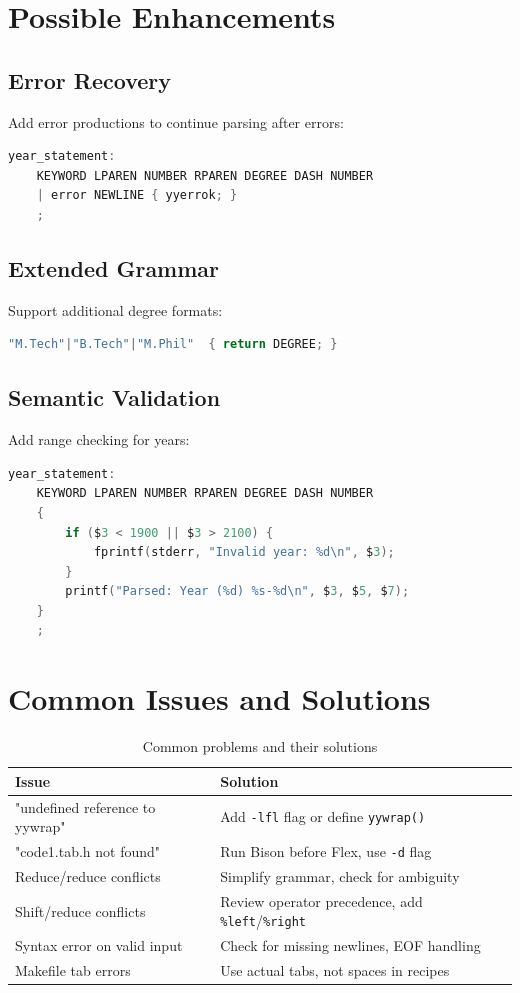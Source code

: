 \documentclass[12pt,a4paper]{article}
\begin{document}
\section{Possible Enhancements}

\subsection{Error Recovery}
Add error productions to continue parsing after errors:
\begin{lstlisting}[language=C]
year_statement:
    KEYWORD LPAREN NUMBER RPAREN DEGREE DASH NUMBER
    | error NEWLINE { yyerrok; }
    ;
\end{lstlisting}

\subsection{Extended Grammar}
Support additional degree formats:
\begin{lstlisting}[language=C]
"M.Tech"|"B.Tech"|"M.Phil"  { return DEGREE; }
\end{lstlisting}

\subsection{Semantic Validation}
Add range checking for years:
\begin{lstlisting}[language=C]
year_statement:
    KEYWORD LPAREN NUMBER RPAREN DEGREE DASH NUMBER
    {
        if ($3 < 1900 || $3 > 2100) {
            fprintf(stderr, "Invalid year: %d\n", $3);
        }
        printf("Parsed: Year (%d) %s-%d\n", $3, $5, $7);
    }
    ;
\end{lstlisting}

\section{Common Issues and Solutions}

\begin{table}[h]
\centering
\small
\begin{tabular}{|p{5cm}|p{6cm}|}
\hline
\textbf{Issue} & \textbf{Solution} \\
\hline
"undefined reference to yywrap" & Add \texttt{-lfl} flag or define \texttt{yywrap()} \\
\hline
"code1.tab.h not found" & Run Bison before Flex, use \texttt{-d} flag \\
\hline
Reduce/reduce conflicts & Simplify grammar, check for ambiguity \\
\hline
Shift/reduce conflicts & Review operator precedence, add \texttt{\%left}/\texttt{\%right} \\
\hline
Syntax error on valid input & Check for missing newlines, EOF handling \\
\hline
Makefile tab errors & Use actual tabs, not spaces in recipes \\
\hline
\end{tabular}
\caption{Common problems and their solutions}
\end{table}
\end{document}
